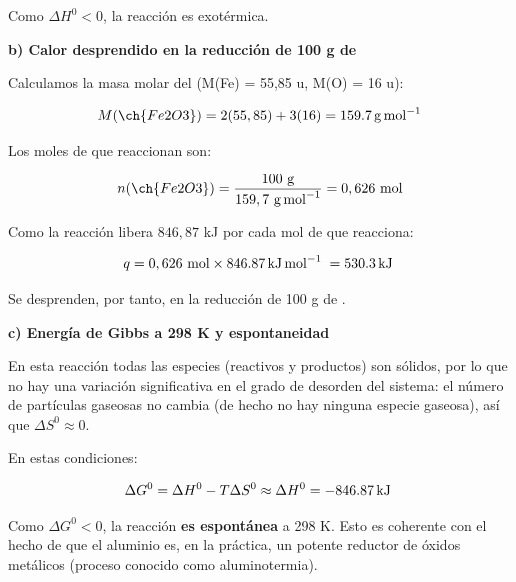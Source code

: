 \begin{exerciseEVAU}
\begin{solu}
        Como \(\Delta H^0 < 0\), la reacción es exotérmica.

        \textbf{b) Calor desprendido en la reducción de 100 g de }

        Calculamos la masa molar del  (M(Fe) = 55,85 u, M(O) = 16 u):

        \begin{equation*}
            M(\ch{Fe2O3}) = 2(55,85) + 3(16) = \SI{159.7}{\gram\per\mole}
        \end{equation*}

        Los moles de  que reaccionan son:

        \begin{equation*}
            n(\ch{Fe2O3}) = \dfrac{100 \ \si{\gram}}{159,7 \ \si{\gram\per\mole}} = 0,626 \ \text{mol}
        \end{equation*}

        Como la reacción libera \(846,87\) kJ por cada mol de  que reacciona:

        \begin{equation*}
            q = 0,626 \ \text{mol} \times \energia[kjmol]{846.87} = \energia[kj]{530.3}
        \end{equation*}

        Se desprenden, por tanto,  en la reducción de 100 g de .

        \textbf{c) Energía de Gibbs a 298 K y espontaneidad}

        En esta reacción todas las especies (reactivos y productos) son sólidos, por lo que no hay una variación significativa en el grado de desorden del sistema: el número de partículas gaseosas no cambia (de hecho no hay ninguna especie gaseosa), así que \(\Delta S^0 \approx 0\).

        En estas condiciones:

        \begin{equation*}
            \Delta G^0 = \Delta H^0 - T \Delta S^0 \approx \Delta H^0 = \energia[kj]{-846.87}
        \end{equation*}

        Como \(\Delta G^0 < 0\), la reacción \textbf{es espontánea} a 298 K. Esto es coherente con el hecho de que el aluminio es, en la práctica, un potente reductor de óxidos metálicos (proceso conocido como aluminotermia).

    \end{solu}
\end{exerciseEVAU}

